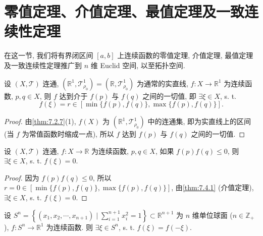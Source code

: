 
\section{零值定理、介值定理、最值定理及一致连续性定理}\label{sec:7.4}

在这一节, 我们将有界闭区间 $[a, b]$ 上连续函数的零值定理, 介值定理, 最值定理及一致连续性定理推广到 $n$ 维 Euclid 空间, 以至拓扑空间.

\begin{theorem}[介值定理]\label{thm:7.4.1}
设 $(X, \mathcal{T})$ 连通, $(\mathbb{R}^{1}, \mathcal{T}_{\rho_{0}}^{1}) = (\mathbb{R}, \mathcal{T}_{\rho_{0}}^{1})$ 为通常的实直线, $f\colon X \to \mathbb{R}^{1}$ 为连续函数, $p, q \in X$, 则 $f$ 达到介于 $f(p)$ 与 $f(q)$ 之间的一切值, 即 $\exists \xi \in X$, s. t.
\[
  f(\xi) = r \in [\min\{f(p), f(q)\}, \max\{f(p), f(q)\}].
\]
\end{theorem}

\begin{proof}
由\cref{thm:7.2.7}(1), $f(X)$ 为 $(\mathbb{R}^{1}, \mathcal{T}_{\rho_{0}}^{1})$ 中的连通集, 即为实直线上的区间 (当 $f$ 为常值函数时缩成一点), 所以 $f$ 达到 $f(p)$ 与 $f(q)$ 之间的一切值.
\end{proof}

\begin{theorem}[零 (根) 值定理]\label{thm:7.4.2}
设 $(X, \mathcal{T})$ 连通, $f\colon X \to \mathbb{R}$ 为连续函数, $p, q \in X$, 如果 $f(p)f(q) \leqslant 0$, 则 $\exists \xi \in X$, s. t. $f(\xi) = 0$.
\end{theorem}

\begin{proof}
因为 $f(p)f(q) \leqslant 0$, 所以 $r = 0 \in [\min\{f(p), f(q)\}, \max\{f(p), f(q)\}]$, 由\cref{thm:7.4.1} (介值定理), $\exists \xi \in X$, s. t. $f(\xi) = 0$.
\end{proof}

\begin{example}\label{ex:7.4.1}
设 $S^{n} = \left\{(x_{1}, x_{2}, \cdots, x_{n+1}) \mid \sum\limits_{i=1}^{n+1} x_{i}^{2} = 1\right\} \subset \mathbb{R}^{n+1}$ 为 $n$ 维单位球面 ($n \in \mathbb{Z}_{+}$), $f\colon S^{n} \to \mathbb{R}^{1}$ 为连续函数. 则 $\exists \xi \in S^{n}$, s. t. $f(\xi) = f(-\xi)$.
\end{example}

